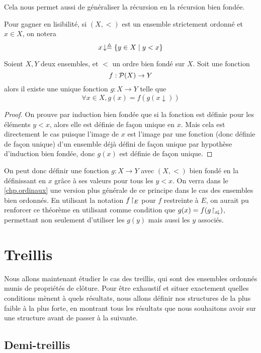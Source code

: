 Cela nous permet aussi de généraliser la récursion en la récursion bien fondée.

\begin{notation}
  Pour gagner en lisibilité, si $(X,<)$ est un ensemble strictement ordonné et
  $x \in X$, on notera
  \[x\!\downarrow \triangleq \{y \in X \mid y < x\}\]
\end{notation}

\begin{theorem}\label{thm.recur.bf}
  Soient $X,Y$ deux ensembles, et $<$ un ordre bien fondé sur $X$. Soit
  une fonction
  \[f : \mathcal{P} (X) \to Y\]
  alors il existe une unique fonction $g : X \to Y$ telle que
  \[\forall x \in X, g(x) = f(g(x\!\downarrow))\]
\end{theorem}

\begin{proof}
  On prouve par induction bien fondée que si la fonction est définie pour les
  éléments $y < x$, alors elle est définie de façon unique en $x$. Mais cela
  est directement le cas puisque l'image de $x$ est l'image par une fonction
  (donc définie de façon unique) d'un ensemble déjà défini de façon unique par
  hypothèse d'induction bien fondée, donc $g(x)$ est définie de façon unique.
\end{proof}

On peut donc définir une fonction $g : X \to Y$ avec $(X,<)$ bien fondé en la
définissant en $x$ grâce à ses valeurs pour tous les $y < x$. On verra dans le
\cref{chp.ordinaux} une version plus générale de ce principe dans le cas des
ensembles bien ordonnés. En utilisant la notation $f\!\upharpoonright_{E}$ pour \og $f$
restreinte à $E$\fg, on aurait pu renforcer ce théorème en utilisant comme
condition que $g(x) = f(g\!\upharpoonright_{x\!\downarrow})$, permettant non seulement
d'utiliser les $g(y)$ mais aussi les $y$ associés.

\section{Treillis}

Nous allons maintenant étudier le cas des treillis, qui sont des ensembles
ordonnés munis de propriétés de clôture. Pour être exhaustif et situer
exactement quelles conditions mènent à quels résultats, nous allons définir nos
structures de la plus faible à la plus forte, en montrant tous les résultats que
nous souhaitons avoir sur une structure avant de passer à la suivante.

\subsection{Demi-treillis}

